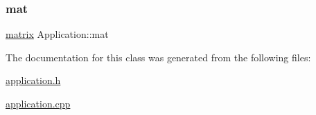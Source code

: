 \mbox{\label{class_application_ae126cc1a7d1f29ad485ddd285dadf3a3}} 
\subsubsection{\texorpdfstring{mat}{mat}}
{\footnotesize\ttfamily \hyperlink{formula_8h_a869e2a5deeb3daa4c82d6bc91cf20d92}{matrix} Application\+::mat\hspace{0.3cm}{\ttfamily [private]}}



The documentation for this class was generated from the following files\+:\begin{DoxyCompactItemize}
\item 
\hyperlink{application_8h}{application.\+h}\item 
\hyperlink{application_8cpp}{application.\+cpp}\end{DoxyCompactItemize}
